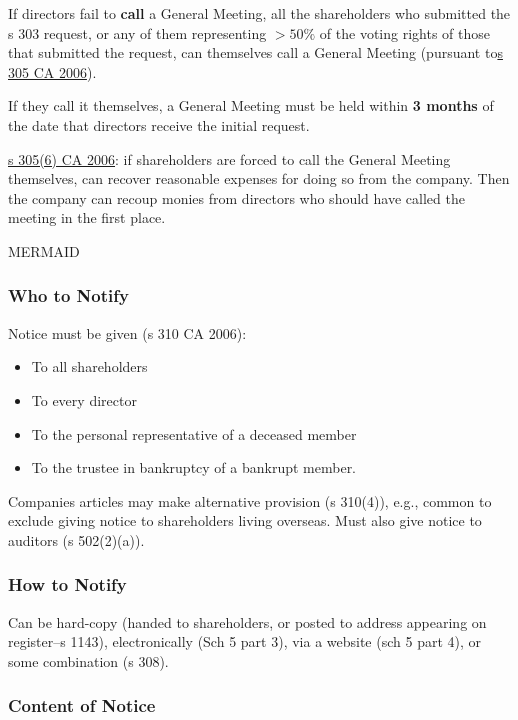 \documentclass[
]{article}
\providecommand{\tightlist}{%
  \setlength{\itemsep}{0pt}\setlength{\parskip}{0pt}}
\begin{document}
If directors fail to \textbf{call} a General Meeting, all the
shareholders who submitted the s 303 request, or any of them
representing {\(> 50\%\)} of the voting rights of those that submitted
the request, can themselves call a General Meeting (pursuant
to\href{https://www.legislation.gov.uk/ukpga/2006/46/section/305}{s 305
CA 2006}).

If they call it themselves, a General Meeting must be held within
\textbf{3 months} of the date that directors receive the initial
request.

\href{https://www.legislation.gov.uk/ukpga/2006/46/section/305}{s 305(6)
CA 2006}: if shareholders are forced to call the General Meeting
themselves, can recover reasonable expenses for doing so from the
company. Then the company can recoup monies from directors who should
have called the meeting in the first place.

MERMAID

\hypertarget{who-to-notify}{%
\subsubsection{Who to Notify}\label{who-to-notify}}

Notice must be given (s 310 CA 2006):

\begin{itemize}
\tightlist
\item
  To all shareholders
\item
  To every director
\item
  To the personal representative of a deceased member
\item
  To the trustee in bankruptcy of a bankrupt member.
\end{itemize}

Companies articles may make alternative provision (s 310(4)), e.g.,
common to exclude giving notice to shareholders living overseas. Must
also give notice to auditors (s 502(2)(a)).

\hypertarget{how-to-notify}{%
\subsubsection{How to Notify}\label{how-to-notify}}

Can be hard-copy (handed to shareholders, or posted to address appearing
on register--s 1143), electronically (Sch 5 part 3), via a website (sch
5 part 4), or some combination (s 308).

\hypertarget{content-of-notice}{%
\subsubsection{Content of Notice}\label{content-of-notice}}
\end{document}
